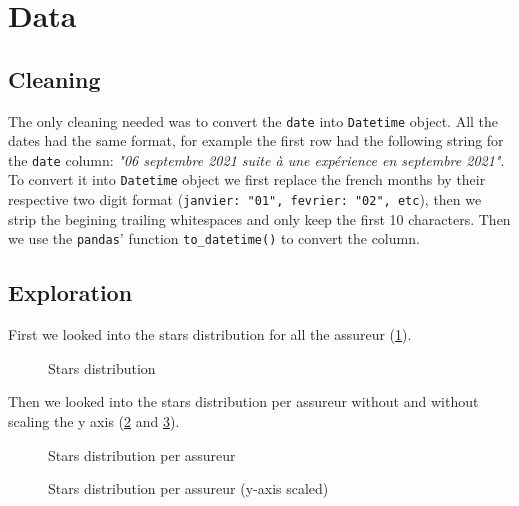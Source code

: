 \documentclass[a4paper, 12pt, one column]{article}
\begin{document}

\newpage


\section{Data}

\subsection{Cleaning}

The only cleaning needed was to convert the \lstinline{date} into \lstinline{Datetime} object.
All the dates had the same format, for example the first row had the following string for the \lstinline{date} column: \textit{"06 septembre 2021 suite à une expérience en septembre 2021"}.
To convert it into \lstinline[language=python]{Datetime} object we first replace the french months by their respective two digit format (\lstinline{janvier: "01", fevrier: "02", etc}), then we strip the begining trailing whitespaces and only keep the first 10 characters. Then we use the \lstinline{pandas}' function \lstinline{to_datetime()} to convert the column.


\subsection{Exploration}

First we looked into the stars distribution for all the assureur (\cref{fig:distrib}).


\begin{figure}[H]
    \centering
    
    \caption{Stars distribution}
    \label{fig:distrib}
\end{figure}

Then we looked into the stars distribution per assureur without and without scaling the y axis (\cref{fig:distrib_split_noscale} and \cref{fig:distrib_split_scale}).

\begin{figure}[H]
    \advance\leftskip-3cm
    
    \caption{Stars distribution per assureur}
    \label{fig:distrib_split_noscale}
\end{figure}


\begin{figure}[H]
    \advance\leftskip-3cm
    
    \caption{Stars distribution per assureur (y-axis scaled)}
    \label{fig:distrib_split_scale}
\end{figure}
\end{document}
